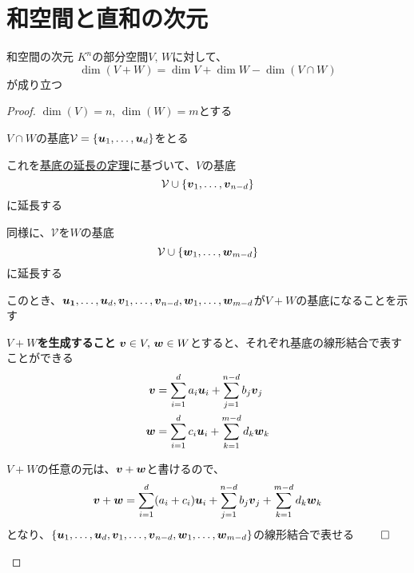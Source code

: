 \documentclass[../../../topic_linear-algebra]{subfiles}
\begin{document}
\sectionline
\section{和空間と直和の次元}

\begin{theorem}{和空間の次元}
  $K^n$の部分空間$V, \, W$に対して、
  \begin{equation*}
    \dim(V + W) = \dim V + \dim W - \dim(V \cap W)
  \end{equation*}
  が成り立つ
\end{theorem}

\begin{proof}
  $\dim(V) = n, \, \dim(W) = m$とする

  \br

  $V \cap W$の基底$\mathcal{V} = \{ \vb*{u}_1,\dots, \vb*{u}_d \}$をとる

  これを\hyperref[thm:basis-extension]{基底の延長の定理}に基づいて、$V$の基底
  \begin{equation*}
    \mathcal{V} \cup \{ \vb*{v}_1, \dots, \vb*{v}_{n-d} \}
  \end{equation*}
  に延長する

  同様に、$\mathcal{V}$を$W$の基底
  \begin{equation*}
    \mathcal{V} \cup \{ \vb*{w}_1, \dots, \vb*{w}_{m-d} \}
  \end{equation*}
  に延長する

  \br

  このとき、$\vb*{u_1}, \dots, \vb*{u}_d, \vb*{v}_1, \dots, \vb*{v}_{n-d}, \vb*{w}_1, \dots, \vb*{w}_{m-d}$が$V + W$の基底になることを示す

  \begin{subpattern}{\bfseries $V+W$を生成すること}
    $\vb*{v} \in V, \, \vb*{w} \in W$とすると、それぞれ基底の線形結合で表すことができる
    \begin{align*}
      \vb*{v} & = \sum_{i=1}^d a_i \vb*{u}_i + \sum_{j=1}^{n-d} b_j \vb*{v}_j \\
      \vb*{w} & = \sum_{i=1}^d c_i \vb*{u}_i + \sum_{k=1}^{m-d} d_k \vb*{w}_k
    \end{align*}

    \br

    $V+W$の任意の元は、$\vb*{v} + \vb*{w}$と書けるので、
    \begin{equation*}
      \vb*{v} + \vb*{w} = \sum_{i=1}^d (a_i + c_i) \vb*{u}_i + \sum_{j=1}^{n-d} b_j \vb*{v}_j + \sum_{k=1}^{m-d} d_k \vb*{w}_k
    \end{equation*}
    となり、$\{ \vb*{u}_1, \dots, \vb*{u}_d, \vb*{v}_1, \dots, \vb*{v}_{n-d}, \vb*{w}_1, \dots, \vb*{w}_{m-d} \}$の線形結合で表せる $\qed$
  \end{subpattern}


\end{proof}
\end{document}
